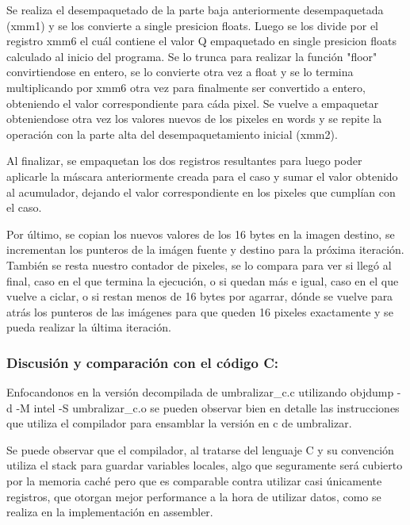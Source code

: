 Se realiza el desempaquetado de la parte baja anteriormente desempaquetada (xmm1) y se los convierte a single presicion floats. Luego se los divide por el registro xmm6 el cuál contiene el valor Q empaquetado en single presicion floats calculado al inicio del programa. Se lo trunca para realizar la función "floor" convirtiendose en entero, se lo convierte otra vez a float y se lo termina multiplicando por xmm6 otra vez para finalmente ser convertido a entero, obteniendo el valor correspondiente para cáda pixel. Se vuelve a empaquetar obteniendose otra vez los valores nuevos de los pixeles en words y se repite la operación con la parte alta del desempaquetamiento inicial (xmm2).

Al finalizar, se empaquetan los dos registros resultantes para luego poder aplicarle la máscara anteriormente creada para el caso y sumar el valor obtenido al acumulador, dejando el valor correspondiente en los pixeles que cumplían con el caso.

Por último, se copian los nuevos valores de los 16 bytes en la imagen destino, se incrementan los punteros de la imágen fuente y destino para la próxima iteración. También se resta nuestro contador de pixeles, se lo compara para ver si llegó al final, caso en el que termina la ejecución, o si quedan más e igual, caso en el que vuelve a ciclar, o si restan menos de 16 bytes por agarrar, dónde se vuelve para atrás los punteros de las imágenes para que queden 16 pixeles exactamente y se pueda realizar la última iteración.



\subsubsection{Discusión y comparación con el código C:}
Enfocandonos en la versión decompilada de umbralizar\_c.c utilizando objdump -d -M intel -S umbralizar\_c.o se pueden observar bien en detalle las instrucciones que utiliza el compilador para ensamblar la versión en c de umbralizar.

Se puede observar que el compilador, al tratarse del lenguaje C y su convención utiliza el stack para guardar variables locales, algo que seguramente será cubierto por la memoria caché pero que es comparable contra utilizar casi únicamente registros, que otorgan mejor performance a la hora de utilizar datos, como se realiza en la implementación en assembler.

